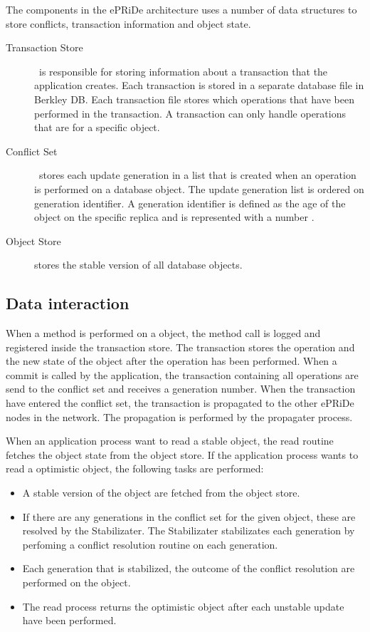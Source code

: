 The components in the ePRiDe architecture uses a number of data structures to store conflicts, transaction information and object state. 
\begin{description}
	
	\item[Transaction Store] \
	is responsible for storing information about a transaction that the application creates. Each transaction is stored in a separate database file in Berkley DB.  Each transaction file stores which operations that have been performed in the transaction. A transaction can only handle operations that are for a specific object.
	
	\item[Conflict Set] \
	stores each update generation in a list that is created when an operation is performed on a database object. The update generation list is ordered on generation identifier. A generation identifier is defined as the age of the object on the specific replica and is represented with a number \cite[]{Syber2007}.
	
	\item[Object Store] stores the stable version of all database objects.
\end{description}
    
 


\subsection{Data interaction} %
\label{sub:data_interaction}

When a method is performed on a object, the method call is logged and registered inside the transaction store. The transaction stores the operation and the new state of the object after the operation has been performed. When a commit is called by the application, the transaction containing all operations are send to the conflict set and receives a generation number. When the transaction have entered the conflict set, the transaction is propagated to the other ePRiDe nodes in the network. The propagation is performed by the propagater process. 

When an application process want to read a stable object, the read routine fetches the object state from the object store. If the application process wants to read a optimistic object, the following tasks are performed: 
\begin{itemize}
	\item A stable version of the object are fetched from the object store.
	\item If there are any generations in the conflict set for the given object, these are resolved by the Stabilizater. The Stabilizater stabilizates each generation by perfoming a conflict resolution routine on each generation. 
	\item Each generation that is stabilized, the outcome of the conflict resolution are performed on the object. 
	\item The read process returns the optimistic object after each unstable update have been performed.
\end{itemize}


